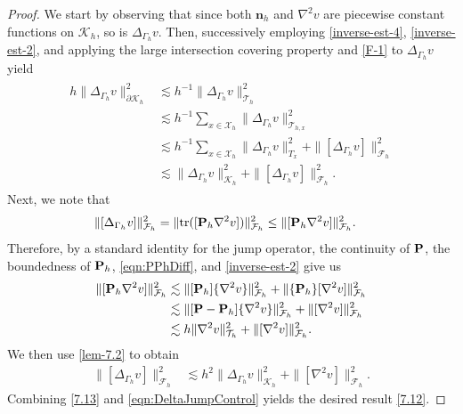 \documentclass[10pt, a4paper]{amsart}
\newcommand{\bn}{{\bm n}}
\newcommand{\nab}{\nabla}
\newcommand{\calT}{\mathcal{T}}
\newcommand{\calF}{\mathcal{F}}
\newcommand{\calK}{\mathcal{K}}
\newcommand{\calX}{\mathcal{X}}
\theoremstyle{definition}
\theoremstyle{remark}
\theoremstyle{example}
\numberwithin{equation}{section}
\begin{document}
\begin{proof}
We start by observing that since both $\bn_h$ and $\nab^2v$ are piecewise constant functions on $\calK_h$, so is $\Delta_{\Gamma_h}v$. Then, successively employing \eqref{inverse-est-4}, \eqref{inverse-est-2}, and applying the large intersection covering property and \eqref{F-1} to $\Delta_{\Gamma_h} v$ yield
\begin{align} \label{7.13}
\begin{split}
h\|\Delta_{\Gamma_h}v\|_{\partial\calK_h}^2
& \lesssim h^{- 1}\|\Delta_{\Gamma_h}v\|_{\calT_h}^2  \\
& \lesssim h^{- 1}\sum_{x \in \calX_h}\|\Delta_{\Gamma_h}v\|_{\calT_{h, x}}^2  \\
& \lesssim h^{- 1}\sum_{x \in \calX_h}\|\Delta_{\Gamma_h}v\|_{T_x}^2 + \|[\Delta_{\Gamma_h}v]\|_{\calF_h}^2  \\
%
&\lesssim \|\Delta_{\Gamma_h} v\|_{\calK_h}^2 + \|[\Delta_{\Gamma_h} v]\|_{\calF_h}^2.
\end{split}
\end{align}
%
Next, we note that
%
\begin{align*}
\|[\Delta_{\Gamma_h}v]\|_{\calF_h}^2
& = \|{\rm tr}([{\bf P}_{h}\nab^2v])\|_{\calF_h}^2
\leq \|[{\bf P}_{h}\nab^2v]\|_{\calF_h}^2.
\end{align*}
Therefore, by a standard identity for the jump operator, the continuity of ${\bf P}$, the boundedness of ${\bf P}_{h}$, \eqref{eqn:PPhDiff}, and \eqref{inverse-est-2} give us
\begin{align}
\begin{split} \label{251110-1}
\|[{\bf P}_{h}\nab^2v]\|_{\calF_h}^2
& \lesssim \|[{\bf P}_{h}]\{\nab^2v\}\|_{\calF_h}^2 + \|\{{\bf P}_{h}\}[\nab^2v]\|_{\calF_h}^2 \\
& \lesssim \|[{\bf P}-{\bf P}_{h}]\{\nab^2v\}\|_{\calF_h}^2 + \|[\nab^2v]\|_{\calF_h}^2 \\
& \lesssim h\|\nab^2v\|_{\calT_h}^2 + \|[\nab^2v]\|_{\calF_h}^2.
\end{split}
\end{align}
We then use %
\eqref{lem-7.2} to obtain
\begin{align}
\|[\Delta_{\Gamma_h}v]\|_{\calF_h}^2
& \lesssim h^2\|\Delta_{\Gamma_h}v\|_{\calK_h}^2 + \|[\nab^2 v]\|_{\calF_h}^2. \label{eqn:DeltaJumpControl}
\end{align}
%
Combining \eqref{7.13} and \eqref{eqn:DeltaJumpControl} yields the desired result \eqref{7.12}.
\end{proof}
\end{document}
